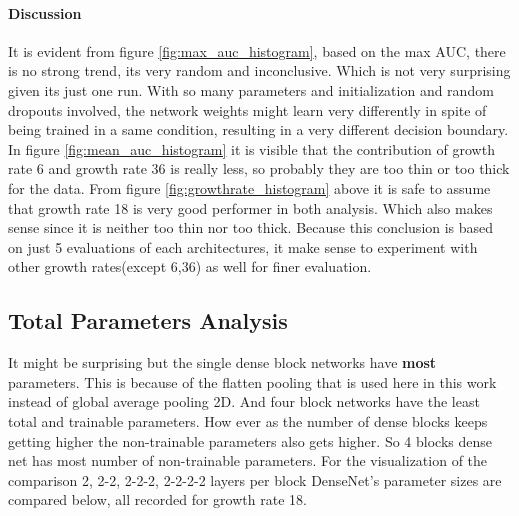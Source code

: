 \paragraph{Discussion\\}
It is evident from figure \ref{fig:max_auc_histogram}, based on the max AUC, there is no strong trend, its very random and inconclusive. Which is not very surprising given its just one run. 
With so many parameters and initialization and random dropouts involved, the network weights might learn very differently in spite of being trained in a same condition, resulting in a very different decision boundary.
In figure \ref{fig:mean_auc_histogram} it is visible that the contribution of growth rate 6 and growth rate 36 is really less, so probably they are too thin or too thick for the data. 
From figure \ref{fig:growthrate_histogram} above it is safe to assume that growth rate 18 is very good performer in both analysis. Which also makes sense since it is neither too thin nor too thick. Because this conclusion 
is based on just 5 evaluations of each architectures, it make sense to experiment with other growth rates(except 6,36) as well for finer evaluation.

\flushbottom
\newpage
\subsection{Total Parameters Analysis}
It might be surprising but the single dense block networks have \textbf{most} parameters. This is because of the flatten pooling that is used here in this work instead of global average pooling 2D. 
And four block networks have the least total and trainable parameters. %
How ever as the number of dense blocks keeps getting higher the non-trainable parameters also gets higher. So 4 blocks dense net has most number of non-trainable parameters.
For the visualization of the comparison 2, 2-2, 2-2-2, 2-2-2-2 layers per block DenseNet's parameter sizes are compared below, all recorded for growth rate 18.

